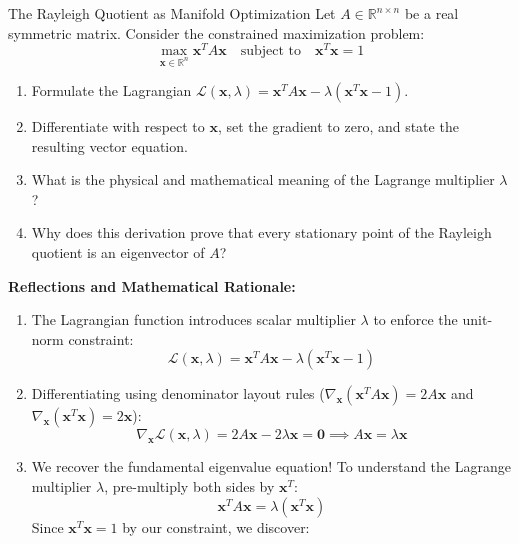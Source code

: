 \begin{ponderbox}{The Rayleigh Quotient as Manifold Optimization}
Let $A \in \mathbb{R}^{n \times n}$ be a real symmetric matrix. Consider the constrained maximization problem:
\begin{equation*}
\max_{\mathbf{x} \in \mathbb{R}^n} \mathbf{x}^T A \mathbf{x} \quad \text{subject to} \quad \mathbf{x}^T \mathbf{x} = 1
\end{equation*}
\begin{enumerate}
    \item Formulate the Lagrangian $\mathcal{L}(\mathbf{x}, \lambda) = \mathbf{x}^T A \mathbf{x} - \lambda (\mathbf{x}^T \mathbf{x} - 1)$.
    \item Differentiate with respect to $\mathbf{x}$, set the gradient to zero, and state the resulting vector equation.
    \item What is the physical and mathematical meaning of the Lagrange multiplier $\lambda$?
    \item Why does this derivation prove that every stationary point of the Rayleigh quotient is an eigenvector of $A$?
\end{enumerate}
\tcblower
\textbf{Reflections and Mathematical Rationale:}
\begin{enumerate}
    \item The Lagrangian function introduces scalar multiplier $\lambda$ to enforce the unit-norm constraint:
    \begin{equation*}
    \mathcal{L}(\mathbf{x}, \lambda) = \mathbf{x}^T A \mathbf{x} - \lambda (\mathbf{x}^T \mathbf{x} - 1)
    \end{equation*}
    \item Differentiating using denominator layout rules ($\nabla_{\mathbf{x}} (\mathbf{x}^T A \mathbf{x}) = 2A\mathbf{x}$ and $\nabla_{\mathbf{x}} (\mathbf{x}^T \mathbf{x}) = 2\mathbf{x}$):
    \begin{equation*}
    \nabla_{\mathbf{x}} \mathcal{L}(\mathbf{x}, \lambda) = 2A\mathbf{x} - 2\lambda \mathbf{x} = \mathbf{0} \implies A\mathbf{x} = \lambda \mathbf{x}
    \end{equation*}
    \item We recover the fundamental eigenvalue equation! To understand the Lagrange multiplier $\lambda$, pre-multiply both sides by $\mathbf{x}^T$:
    \begin{equation*}
    \mathbf{x}^T A \mathbf{x} = \lambda (\mathbf{x}^T \mathbf{x})
    \end{equation*}
    Since $\mathbf{x}^T \mathbf{x} = 1$ by our constraint, we discover:

\end{enumerate}
\end{ponderbox}
